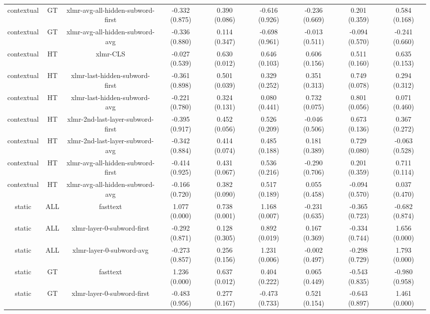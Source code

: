 \begin{sidewaystable}[htb]
\begin{tabular}{@{}ccccccccc@{}}
        contextual & GT & xlmr-avg-all-hidden-subword-first & -0.332 (0.875) & 0.390 (0.086) & -0.616 (0.926) & -0.236 (0.669) & 0.201 (0.359) & 0.584 (0.168) \\
        contextual & GT & xlmr-avg-all-hidden-subword-avg & -0.336 (0.880) & 0.114 (0.347) & -0.698 (0.961) & -0.013 (0.511) & -0.094 (0.570) & -0.241 (0.660) \\
        contextual & HT & xlmr-CLS & -0.027 (0.539) & 0.630 (0.012) & 0.646 (0.103) & 0.606 (0.156) & 0.511 (0.160) & 0.635 (0.153) \\
        contextual & HT & xlmr-last-hidden-subword-first & -0.361 (0.898) & 0.501 (0.039) & 0.329 (0.252) & 0.351 (0.313) & 0.749 (0.078) & 0.294 (0.312) \\
        contextual & HT & xlmr-last-hidden-subword-avg & -0.221 (0.780) & 0.324 (0.131) & 0.080 (0.441) & 0.732 (0.075) & 0.801 (0.056) & 0.071 (0.460) \\
        contextual & HT & xlmr-2nd-last-layer-subword-first & -0.395 (0.917) & 0.452 (0.056) & 0.526 (0.209) & -0.046 (0.506) & 0.673 (0.136) & 0.367 (0.272) \\
        contextual & HT & xlmr-2nd-last-layer-subword-avg & -0.342 (0.884) & 0.414 (0.074) & 0.485 (0.188) & 0.181 (0.389) & 0.729 (0.080) & -0.063 (0.528) \\
        contextual & HT & xlmr-avg-all-hidden-subword-first & -0.414 (0.925) & 0.431 (0.067) & 0.536 (0.216) & -0.290 (0.706) & 0.201 (0.359) & 0.711 (0.114) \\
        contextual & HT & xlmr-avg-all-hidden-subword-avg & -0.166 (0.720) & 0.382 (0.090) & 0.517 (0.189) & 0.055 (0.458) & -0.094 (0.570) & 0.037 (0.470) \\
        static & ALL & fasttext & 1.077 (0.000) & 0.738 (0.001) & 1.168 (0.007) & -0.231 (0.635) & -0.365 (0.723) & -0.682 (0.874) \\
        static & ALL & xlmr-layer-0-subword-first & -0.292 (0.871) & 0.128 (0.305) & 0.892 (0.019) & 0.167 (0.369) & -0.334 (0.744) & 1.656 (0.000) \\
        static & ALL & xlmr-layer-0-subword-avg & -0.273 (0.857) & 0.256 (0.156) & 1.231 (0.006) & -0.002 (0.497) & -0.298 (0.729) & 1.793 (0.000) \\
        static & GT & fasttext & 1.236 (0.000) & 0.637 (0.012) & 0.404 (0.222) & 0.065 (0.449) & -0.543 (0.835) & -0.980 (0.958) \\
        static & GT & xlmr-layer-0-subword-first & -0.483 (0.956) & 0.277 (0.167) & -0.473 (0.733) & 0.521 (0.154) & -0.643 (0.897) & 1.461 (0.000) \\

\end{tabular}
\end{sidewaystable}
